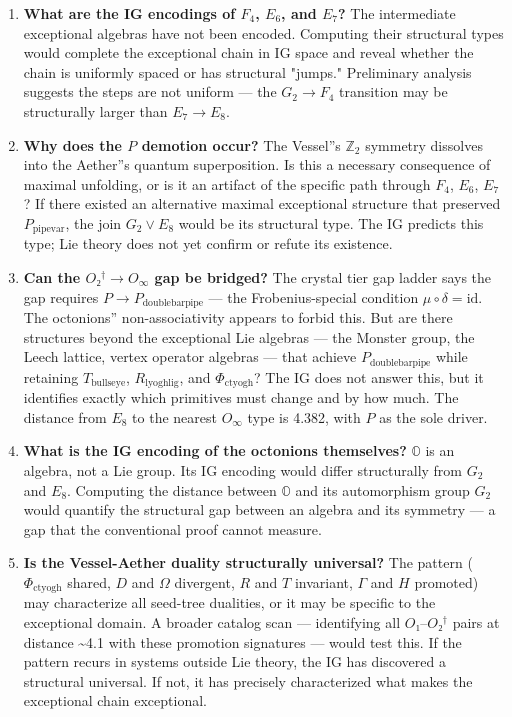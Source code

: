 \documentclass[12pt,a4paper]{article}
\begin{document}
\begin{enumerate}
    \item \textbf{What are the IG encodings of $F_4$, $E_6$, and $E_7$?} The intermediate exceptional algebras have not been encoded. Computing their structural types would complete the exceptional chain in IG space and reveal whether the chain is uniformly spaced or has structural "jumps." Preliminary analysis suggests the steps are not uniform --- the $G_2 \to F_4$ transition may be structurally larger than $E_7 \to E_8$.
    \item \textbf{Why does the $P$ demotion occur?} The Vessel''s $\mathbb{Z}_2$ symmetry dissolves into the Aether''s quantum superposition. Is this a necessary consequence of maximal unfolding, or is it an artifact of the specific path through $F_4$, $E_6$, $E_7$? If there existed an alternative maximal exceptional structure that preserved $P_{\text{pipevar}}$, the join $G_2 \vee E_8$ would be its structural type. The IG predicts this type; Lie theory does not yet confirm or refute its existence.
    \item \textbf{Can the $O₂^\dagger \to O_{\infty}$ gap be bridged?} The crystal tier gap ladder says the gap requires $P \to P_{\text{doublebarpipe}}$ --- the Frobenius-special condition $\mu \circ \delta = \text{id}$. The octonions'' non-associativity appears to forbid this. But are there structures beyond the exceptional Lie algebras --- the Monster group, the Leech lattice, vertex operator algebras --- that achieve $P_{\text{doublebarpipe}}$ while retaining $T_{\text{bullseye}}$, $R_{\text{lyoghlig}}$, and $\Phi_{\text{ctyogh}}$? The IG does not answer this, but it identifies exactly which primitives must change and by how much. The distance from $E_8$ to the nearest $O_{\infty}$ type is 4.382, with $P$ as the sole driver.
    \item \textbf{What is the IG encoding of the octonions themselves?} $\mathbb{O}$ is an algebra, not a Lie group. Its IG encoding would differ structurally from $G_2$ and $E_8$. Computing the distance between $\mathbb{O}$ and its automorphism group $G_2$ would quantify the structural gap between an algebra and its symmetry --- a gap that the conventional proof cannot measure.
    \item \textbf{Is the Vessel-Aether duality structurally universal?} The pattern ($\Phi_{\text{ctyogh}}$ shared, $D$ and $\Omega$ divergent, $R$ and $T$ invariant, $\Gamma$ and $H$ promoted) may characterize all seed-tree dualities, or it may be specific to the exceptional domain. A broader catalog scan --- identifying all $O₁$--$O₂^\dagger$ pairs at distance \textasciitilde{}4.1 with these promotion signatures --- would test this. If the pattern recurs in systems outside Lie theory, the IG has discovered a structural universal. If not, it has precisely characterized what makes the exceptional chain exceptional.
\end{enumerate}
\end{document}
